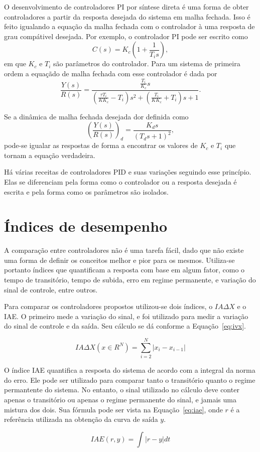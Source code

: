 O desenvolvimento de controladores PI por síntese direta é uma forma de obter
controladores a partir da resposta desejada do sistema em malha fechada. Isso é
feito igualando a equação da malha fechada com o controlador à uma resposta de
grau compátivel desejada. Por exemplo, o controlador PI pode ser escrito como
%
\begin{equation}
	C(s) = K_c (1 + \frac{1}{T_{i}s}),
\end{equation}
%
em que \(K_c\) e \(T_i\) são parâmetros do controlador. Para um sistema de
primeira ordem a equaçãdo de malha fechada com esse controlador é dada por
%
\begin{equation}
	\frac{Y(s)}{R(s)} = \frac{\frac{T_i}{K_c}s}{(\frac{\tau{}T_i}{KK_c}-T_i)s^2+(\frac{T_i}{KK_c}+T_i)s+1}.
\end{equation}

Se a dinâmica de malha fechada desejada dor definida como
%
\begin{equation}
	{\left(\frac{Y(s)}{R(s)}\right)}_d = \frac{K_{d}s}{{(T_{d}s+1)}^2},
\end{equation}
%
pode-se igualar as respostas de forma a encontrar os valores de \(K_c\) e
\(T_i\) que tornam a equação verdadeira.

Há várias receitas de controladores PID e suas variações seguindo esse
princípio. Elas se diferenciam pela forma como o controlador ou a resposta
desejada é escrita e pela forma como os parâmetros são isolados.

\section{Índices de desempenho}%
\label{sec:indexes}

A comparação entre controladores não é uma tarefa fácil, dado que não existe uma
forma de definir os conceitos melhor e pior para os mesmos. Utiliza-se portanto
índices que quantificam a resposta com base em algum fator, como o tempo de
transitório, tempo de subida, erro em regime permanente, e variação do sinal de
controle, entre outros.

Para comparar os controladores propostos utilizou-se dois índices, o
\(IA\Delta{}X\) e o IAE\@. O primeiro mede a variação do sinal, e foi utilizado
para medir a variação do sinal de controle e da saída. Seu cálculo se dá
conforme a Equação~\eqref{eq:ivx}.

\begin{equation}
	\label{eq:ivx}
	IA\Delta{}X(x\in{}R^N) = \sum_{i=2}^{N}{\left|x_i-x_{i-1}\right|}
\end{equation}

O índice IAE quantifica a resposta do sistema de acordo com a integral da norma
do erro. Ele pode ser utilizado para comparar tanto o transitório quanto o
regime permantente do sistema. No entanto, o sinal utilizado no cálculo deve
conter apenas o transitório ou apenas o regime permanente do sinal, e jamais uma
mistura dos dois. Sua fórmula pode ser vista na Equação~\eqref{eq:iae}, onde
\(r\) é a referência utilizada na obtenção da curva de saída \(y\).

\begin{equation}
	\label{eq:iae}
	IAE(r,y) = \int{\left|r-y\right|}dt
\end{equation}
